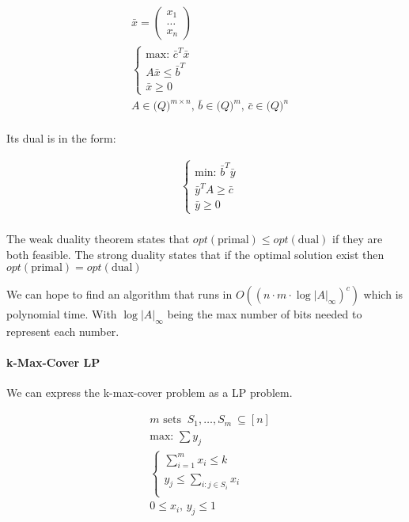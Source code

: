 \documentclass[]{article}
\begin{document}
\begin{align*}
	&\bar{x} = \begin{pmatrix}
	x_1\\
	\dots \\
	x_n
	\end{pmatrix}\\
	&\begin{cases}
	\text{max: } \bar{c}^T \bar{x}\\
	A \bar{x} \leq \bar{b}^T\\
	\bar{x} \geq 0
	\end{cases}\\
	&A \in \mathscr(Q)^{m\times n},\, \bar{b} \in \mathscr(Q)^{m},\, \bar{c} \in \mathscr(Q)^{n}\\
\end{align*}

Its dual is in the form:

\begin{align*}
&\begin{cases}
\text{min: } \bar{b}^T \bar{y}\\
\bar{y}^T A \geq \bar{c}\\
\bar{y} \geq 0
\end{cases}\\
\end{align*}

The weak duality theorem states that $opt(\text{primal}) \leq opt(\text{dual})$ if they are both feasible. The strong duality states that if the optimal solution exist then $opt(\text{primal}) = opt(\text{dual})$

We can hope to find an algorithm that runs in $O\left(\left(n\cdot m \cdot \log |A|_\infty \right)^c\right)$ which is polynomial time. With $\log |A|_\infty $ being the max number of bits needed to represent each number.

\paragraph{k-Max-Cover LP}
We can express the k-max-cover problem as a LP problem. 

\begin{align*}
&m \text{ sets }\ S_1,\dots,S_m\ \subseteq [n]\\
&\text{max: } \sum y_j\\
&\begin{cases}
\sum_{i=1}^{m} x_i \leq k\\
y_j \leq \sum_{i: j\in S_i}^{} x_i \\
\end{cases}\\
&0 \leq x_i,\, y_j \leq 1
\end{align*}
\end{document}
